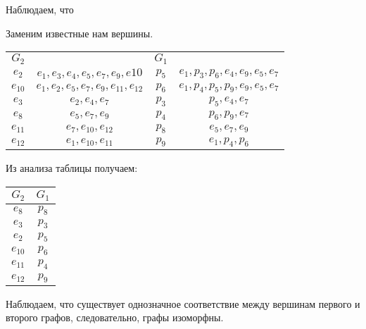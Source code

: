\documentclass[12pt, a4paper] {ncc}
\begin{document}
Наблюдаем, что 

Заменим известные нам вершины.

\begin{tabular}{|c c||c c|}
\hline
$G_2$    &                                          & $G_1$ & \\
$e_2$    & $e_1, e_3, e_4, e_5, e_7, e_9, e{10}$    & $p_{5}$ & $e_1, p_3, p_6, e_4, e_9, e_5, e_7$ \\
$e_{10}$ & $e_1, e_2, e_5, e_7, e_9, e_{11}, e_{12}$& $p_{6}$ & $e_1, p_4, p_5, p_9, e_9, e_5, e_7$ \\
$e_3$    & $e_2, e_4, e_7$                          & $p_{3}$ & $p_5, e_4, e_7$ \\
$e_8$    & $e_5, e_7, e_9$                          & $p_{4}$ & $p_6, p_9, e_7$ \\ 
$e_{11}$ & $e_7, e_{10}, e_{12}$                    & $p_{8}$ & $e_5, e_7, e_9$ \\ 
$e_{12}$ & $e_1, e_{10}, e_{11}$                    & $p_{9}$ & $e_1, p_4, p_6$ \\
\hline
\end{tabular}

Из анализа таблицы получаем:

\begin{tabular}{|cc|}
\hline
$G_2$ & $G_1$ \\ \hline
$e_8$ & $p_{8}$ \\
$e_3$ & $p_{3}$ \\
$e_2$ & $p_5$ \\
$e_{10}$ & $p_6$ \\
$e_{11}$ & $p_4$ \\
$e_{12}$ & $p_9$ \\
\hline
\end{tabular}

Наблюдаем, что существует однозначное соответствие между вершинам
 первого и второго графов, следовательно, графы изоморфны. 
\end{document}
